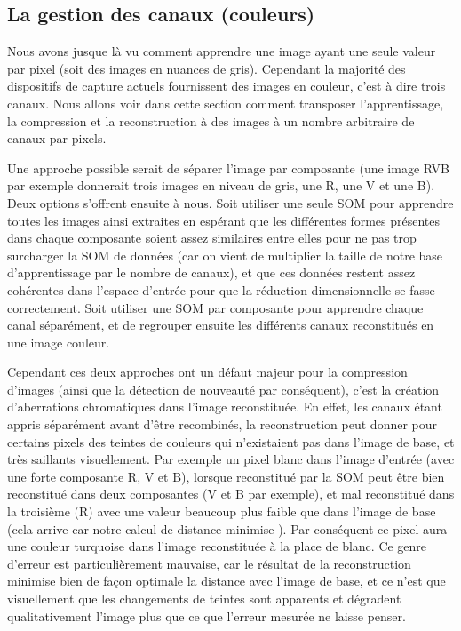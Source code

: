 	\subsection{La gestion des canaux (couleurs)}\label{sec:img:colors}

	Nous avons jusque là vu comment apprendre une image ayant une seule valeur par pixel (soit des images en nuances de gris). Cependant la majorité des dispositifs de capture actuels fournissent des images en couleur, c'est à dire trois canaux. Nous allons voir dans cette section comment transposer l'apprentissage, la compression et la reconstruction à des images à un nombre arbitraire de canaux par pixels.

	Une approche possible serait de séparer l'image par composante (une image RVB par exemple donnerait trois images en niveau de gris, une R, une V et une B). Deux options s'offrent ensuite à nous. Soit utiliser une seule SOM pour apprendre toutes les images ainsi extraites en espérant que les différentes formes présentes dans chaque composante soient assez similaires entre elles pour ne pas trop surcharger la SOM de données (car on vient de multiplier la taille de notre base d'apprentissage par le nombre de canaux), et que ces données restent assez cohérentes dans l'espace d'entrée pour que la réduction dimensionnelle se fasse correctement. Soit utiliser une SOM par composante pour apprendre chaque canal séparément, et de regrouper ensuite les différents canaux reconstitués en une image couleur. 
	
	Cependant ces deux approches ont un défaut majeur pour la compression d'images (ainsi que la détection de nouveauté par conséquent), c'est la création d'aberrations chromatiques dans l'image reconstituée. En effet, les canaux étant appris séparément avant d'être recombinés, la reconstruction peut donner pour certains pixels des teintes de couleurs qui n'existaient pas dans l'image de base, et très saillants visuellement. Par exemple un pixel blanc dans l'image d'entrée (avec une forte composante R, V et B), lorsque reconstitué par la SOM peut être bien reconstitué dans deux composantes (V et B par exemple), et mal reconstitué dans la troisième (R) avec une valeur beaucoup plus faible que dans l'image de base (cela arrive car notre calcul de distance minimise ). Par conséquent ce pixel aura une couleur turquoise dans l'image reconstituée à la place de blanc. Ce genre d'erreur est particulièrement mauvaise, car le résultat de la reconstruction minimise bien de façon optimale la distance avec l'image de base, et ce n'est que visuellement que les changements de teintes sont apparents et dégradent qualitativement l'image plus que ce que l'erreur mesurée ne laisse penser.

